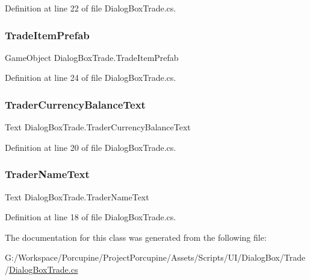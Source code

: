 Definition at line 22 of file Dialog\+Box\+Trade.\+cs.

\mbox{\label{class_dialog_box_trade_a5f2791c62e9b64d3f94362d9910e7d38}} 
\subsubsection{\texorpdfstring{Trade\+Item\+Prefab}{TradeItemPrefab}}
{\footnotesize\ttfamily Game\+Object Dialog\+Box\+Trade.\+Trade\+Item\+Prefab}



Definition at line 24 of file Dialog\+Box\+Trade.\+cs.

\mbox{\label{class_dialog_box_trade_a44857603ccdc822f48023d32d95c667c}} 
\subsubsection{\texorpdfstring{Trader\+Currency\+Balance\+Text}{TraderCurrencyBalanceText}}
{\footnotesize\ttfamily Text Dialog\+Box\+Trade.\+Trader\+Currency\+Balance\+Text}



Definition at line 20 of file Dialog\+Box\+Trade.\+cs.

\mbox{\label{class_dialog_box_trade_a39f78d608909c5f4d0e1ee8e43348e07}} 
\subsubsection{\texorpdfstring{Trader\+Name\+Text}{TraderNameText}}
{\footnotesize\ttfamily Text Dialog\+Box\+Trade.\+Trader\+Name\+Text}



Definition at line 18 of file Dialog\+Box\+Trade.\+cs.



The documentation for this class was generated from the following file\+:\begin{DoxyCompactItemize}
\item 
G\+:/\+Workspace/\+Porcupine/\+Project\+Porcupine/\+Assets/\+Scripts/\+U\+I/\+Dialog\+Box/\+Trade/\hyperlink{_dialog_box_trade_8cs}{Dialog\+Box\+Trade.\+cs}\end{DoxyCompactItemize}
